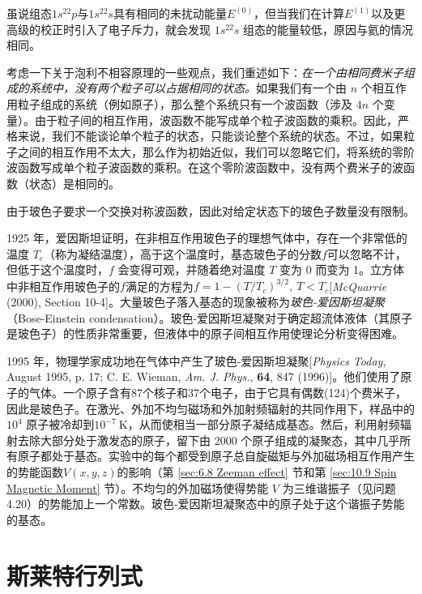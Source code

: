    虽说组态$1s^22p$与$1s^22s$具有相同的未扰动能量$E^{\left(0\right)}$，但当我们在计算$E^{\left(1\right)}$以及更高级的校正时引入了电子斥力，就会发现 $1s^22s$ 组态的能量较低，原因与氦的情况相同。

    考虑一下关于泡利不相容原理的一些观点，我们重述如下：\textit{在一个由相同费米子组成的系统中，没有两个粒子可以占据相同的状态。}如果我们有一个由 $n$ 个相互作用粒子组成的系统（例如原子），那么整个系统只有一个波函数（涉及 $4n$ 个变量）。由于粒子间的相互作用，波函数不能写成单个粒子波函数的乘积。因此，严格来说，我们不能谈论单个粒子的状态，只能谈论整个系统的状态。不过，如果粒子之间的相互作用不太大，那么作为初始近似，我们可以忽略它们，将系统的零阶波函数写成单个粒子波函数的乘积。在这个零阶波函数中，没有两个费米子的波函数（状态）是相同的。

    由于玻色子要求一个交换对称波函数，因此对给定状态下的玻色子数量没有限制。

    1925 年，爱因斯坦证明，在非相互作用玻色子的理想气体中，存在一个非常低的温度 $T_c$（称为凝结温度），高于这个温度时，基态玻色子的分数$f$可以忽略不计，但低于这个温度时，$f$ 会变得可观，并随着绝对温度 $T$ 变为 0 而变为 1。立方体中非相互作用玻色子的$f$满足的方程为$f = 1 - \left(T/T_c\right)^{3/2}, \: T < T_c$[\textit{McQuarrie} (2000), Section 10-4]。大量玻色子落入基态的现象被称为\textit{玻色-爱因斯坦凝聚}（Bose-Einstein condensation）。玻色-爱因斯坦凝聚对于确定超流体液体（其原子是玻色子）的性质非常重要，但液体中的原子间相互作用使理论分析变得困难。

    1995 年，物理学家成功地在气体中产生了玻色-爱因斯坦凝聚[\textit{Physics Today}, August 1995, p. 17; C. E. Wieman, \textit{Am. J. Phys.}, \textbf{64}, 847 (1996)]。他们使用了原子的气体。一个原子含有87个核子和37个电子，由于它具有偶数(124)个费米子，因此是玻色子。在激光、外加不均匀磁场和外加射频辐射的共同作用下，样品中的$10^4$ 原子被冷却到$10^{-7} \: \mathrm{K}$，从而使相当一部分原子凝结成基态。然后，利用射频辐射去除大部分处于激发态的原子，留下由 2000 个原子组成的凝聚态，其中几乎所有原子都处于基态。实验中的每个都受到原子总自旋磁矩与外加磁场相互作用产生的势能函数$V\left(x,y,z\right)$的影响（第 \ref{sec:6.8 Zeeman effect} 节和第 \ref{sec:10.9 Spin Magnetic Moment} 节）。不均匀的外加磁场使得势能 $V$ 为三维谐振子（见问题4.20）的势能加上一个常数。玻色-爱因斯坦凝聚态中的原子处于这个谐振子势能的基态。

\section{斯莱特行列式}
\label{sec:10.6 Slater Determinants}

